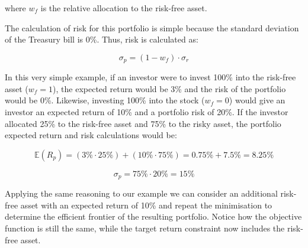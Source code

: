 where \(w_f\) is the relative allocation to the risk-free asset.

The calculation of risk for this portfolio is simple because the
standard deviation of the Treasury bill is 0\%. Thus, risk is calculated
as:

\[ \sigma_p = (1-w_f)\cdot \sigma_r \]

In this very simple example, if an investor were to invest 100\% into
the risk-free asset (\(w_f=1\)), the expected return would be 3\% and
the risk of the portfolio would be 0\%. Likewise, investing 100\% into
the stock (\(w_f=0\)) would give an investor an expected return of 10\%
and a portfolio risk of 20\%. If the investor allocated 25\% to the
risk-free asset and 75\% to the risky asset, the portfolio expected
return and risk calculations would be:

\[ \mathbb{E}(R_p) = (3\% \cdot 25\%) + (10\% \cdot 75\%) = 0.75\% + 7.5\% = 8.25\% \]

\[ \sigma_p = 75\% \cdot 20\% = 15\% \]

Applying the same reasoning to our example we can consider an additional
risk-free asset with an expected return of 10\% and repeat the
minimisation to determine the efficient frontier of the resulting
portfolio. Notice how the objective function is still the same, while
the target return constraint now includes the risk-free asset.

